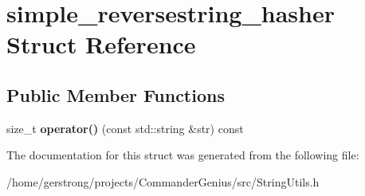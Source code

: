 \hypertarget{structsimple__reversestring__hasher}{
\section{simple\_\-reversestring\_\-hasher Struct Reference}
\label{structsimple__reversestring__hasher}
}
\subsection*{Public Member Functions}
\begin{DoxyCompactItemize}
\item 
\hypertarget{structsimple__reversestring__hasher_a71db03181536d3031f498362e42651a2}{
size\_\-t {\bfseries operator()} (const std::string \&str) const }
\label{structsimple__reversestring__hasher_a71db03181536d3031f498362e42651a2}

\end{DoxyCompactItemize}


The documentation for this struct was generated from the following file:\begin{DoxyCompactItemize}
\item 
/home/gerstrong/projects/CommanderGenius/src/StringUtils.h\end{DoxyCompactItemize}
